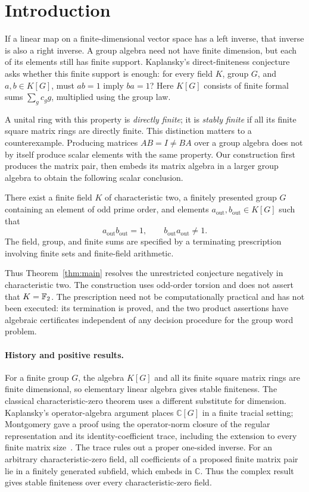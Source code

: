\section{Introduction}
\label{sec:introduction}

If a linear map on a finite-dimensional vector space has a left inverse, that inverse is also a right inverse. A group algebra need not have finite dimension, but each of its elements still has finite support. Kaplansky's direct-finiteness conjecture asks whether this finite support is enough: for every field $K$, group $G$, and $a,b\in K[G]$, must $ab=1$ imply $ba=1$? Here $K[G]$ consists of finite formal sums $\sum_g c_g g$, multiplied using the group law.

A unital ring with this property is \emph{directly finite}; it is \emph{stably finite} if all its finite square matrix rings are directly finite. This distinction matters to a counterexample. Producing matrices $AB=I\ne BA$ over a group algebra does not by itself produce scalar elements with the same property. Our construction first produces the matrix pair, then embeds its matrix algebra in a larger group algebra to obtain the following scalar conclusion.

\begin{theorem}
\label{thm:main}
There exist a finite field $K$ of characteristic two, a finitely presented group $G$ containing an element of odd prime order, and elements $a_{\mathrm{out}},b_{\mathrm{out}}\in K[G]$ such that
\[
a_{\mathrm{out}}b_{\mathrm{out}}=1,
\qquad b_{\mathrm{out}}a_{\mathrm{out}}\ne1.
\]
The field, group, and finite sums are specified by a terminating prescription involving finite sets and finite-field arithmetic.
\end{theorem}

Thus Theorem~\ref{thm:main} resolves the unrestricted conjecture negatively in characteristic two. The construction uses odd-order torsion and does not assert that $K=\mathbb F_2$. The prescription need not be computationally practical and has not been executed: its termination is proved, and the two product assertions have algebraic certificates independent of any decision procedure for the group word problem.

\paragraph{History and positive results.}
For a finite group $G$, the algebra $K[G]$ and all its finite square matrix rings are finite dimensional, so elementary linear algebra gives stable finiteness. The classical characteristic-zero theorem uses a different substitute for dimension. Kaplansky's operator-algebra argument places $\mathbb C[G]$ in a finite tracial setting; Montgomery gave a proof using the operator-norm closure of the regular representation and its identity-coefficient trace, including the extension to every finite matrix size~\cite{Montgomery1969}. The trace rules out a proper one-sided inverse. For an arbitrary characteristic-zero field, all coefficients of a proposed finite matrix pair lie in a finitely generated subfield, which embeds in $\mathbb C$. Thus the complex result gives stable finiteness over every characteristic-zero field.

